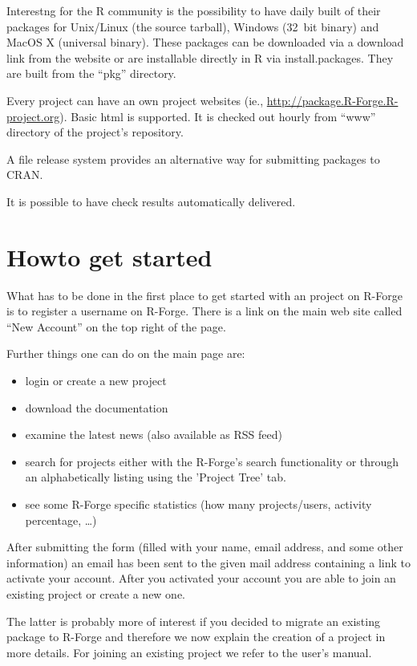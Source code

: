 Interestng for the R community is the possibility to have daily built
of their packages for Unix/Linux (the source tarball), Windows
(32~bit binary) and MacOS X (universal binary). These packages can be
downloaded via a download link from the website or are installable
directly in R via install.packages. They are built from the ``pkg''
directory.

Every project can have an own project websites (ie.,
\url{http://package.R-Forge.R-project.org}). Basic html is
supported. It is checked out hourly from ``www'' directory of the
project's repository.

A file release system provides an
alternative way for submitting packages to CRAN. 

It is possible to have check results automatically delivered. 

\section{Howto get started}

What has to be done in the first place to get started with an project
on R-Forge is to register a username on R-Forge. There is a link on
the main web site called ``New Account'' on the top right of the page.

Further things one can do on the main page are:

\begin{itemize}
\item login or create a new project
\item download the documentation
\item examine the latest news (also available as RSS feed)
\item search for projects either with the R-Forge's search
  functionality or through an 
  alphabetically listing using the 'Project Tree' tab. 
\item see some R-Forge specific statistics (how many projects/users,
  activity percentage, \ldots{})
\end{itemize}

After submitting the form (filled with your name, email address, and
some other information) an email has been sent to the given mail
address containing a link to activate your account. After you
activated your account you are able to join an existing project or
create a new one.

The latter is probably more of interest if you decided to migrate an
existing package to R-Forge and therefore we now explain the creation
of a project in more details. For joining an existing project we refer
to the user's manual.


